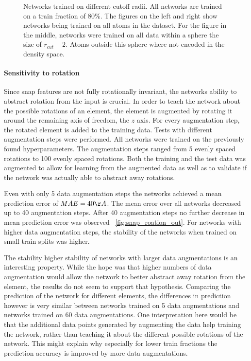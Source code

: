 \begin{figure}[!htb]
  \endminipage
  \caption{
  Networks trained on different cutoff radii. All networks are trained on a train fraction of 80\%.
  The figures on the left and right show networks being trained on all atoms in the dataset.
  For the figure in the middle, networks were trained on all data within a sphere the size of
  $r_{cut} - 2$. Atoms outside this sphere where not encoded in the density space.
  }
  \label{fig:snap_hyperparameter}
\end{figure}


\paragraph{Sensitivity to rotation}
Since snap features are not fully rotationally invariant, the networks ability to abstract rotation from the input is crucial.
In order to teach the network about the possible rotations of an element, 
the element is augmented by rotating it around the remaining axis of freedom, the $z$ axis.
For every augmentation step, the rotated element is added to the training data.
Tests with different augmentation steps were performed.
All networks were trained on the previously found hyperparameters.
The augmentation steps ranged from 5 evenly spaced rotations to 100 evenly spaced rotations.
Both the training and the test data was augmented to allow for learning from the augmented data
as well as to validate if the network was actually able to abstract away rotations.

Even with only 5 data augmentation steps the networks achieved a mean prediction error of $MAE = 40 \AA$.
The mean error over all networks decreased up to 40 augmentation steps.
After 40 augmentation steps no further decrease in mean prediction error was observed ~\ref{fig:snap_roation_out}.
For networks with higher data augmentation steps, the stability of the networks when trained on small train splits was higher.

The stability higher stability of networks with larger data augmentations is an interesting property.
While the hope was that higher numbers of data augmentation would allow the network to better abstract away rotation from the
element, the results do not seem to support that hypothesis.
Comparing the prediction of the network for different elements, the differences in prediction however is
very similar between networks trained on 5 data augmentations and networks trained on 60 data augmentations.
One interpretation here would be that the additional data points generated by augmenting the data help training the network,
rather than teaching it about the different possible rotations of the network.
This might explain why especially for lower train fractions the prediction accuracy is improved by more data augmentations.


